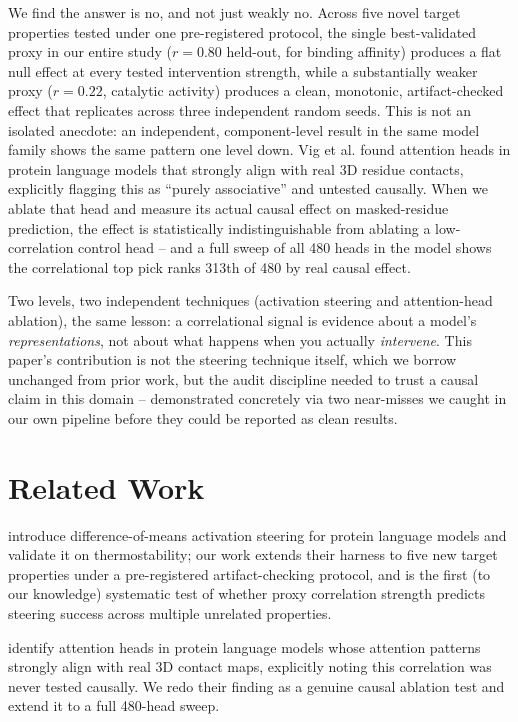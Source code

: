 \documentclass{article}
\begin{document}
We find the answer is no, and not just weakly no. Across five novel
target properties tested under one pre-registered protocol, the single
best-validated proxy in our entire study ($r=0.80$ held-out, for binding
affinity) produces a flat null effect at every tested intervention
strength, while a substantially weaker proxy ($r=0.22$, catalytic
activity) produces a clean, monotonic, artifact-checked effect that
replicates across three independent random seeds. This is not an isolated
anecdote: an independent, component-level result in the same model
family shows the same pattern one level down. Vig et al.
\citep{vig2021bertology} found attention heads in protein language models
that strongly align with real 3D residue contacts, explicitly flagging
this as ``purely associative'' and untested causally. When we ablate
that head and measure its actual causal effect on masked-residue
prediction, the effect is statistically indistinguishable from ablating
a low-correlation control head -- and a full sweep of all 480 heads in
the model shows the correlational top pick ranks 313th of 480 by real
causal effect.

Two levels, two independent techniques (activation steering and
attention-head ablation), the same lesson: a correlational signal is
evidence about a model's \emph{representations}, not about what happens
when you actually \emph{intervene}. This paper's contribution is not the
steering technique itself, which we borrow unchanged from prior work, but
the audit discipline needed to trust a causal claim in this domain --
demonstrated concretely via two near-misses we caught in our own
pipeline before they could be reported as clean results.

\section{Related Work}

\citet{huang2025steering} introduce difference-of-means activation
steering for protein language models and validate it on thermostability;
our work extends their harness to five new target properties under a
pre-registered artifact-checking protocol, and is the first (to our
knowledge) systematic test of whether proxy correlation strength predicts
steering success across multiple unrelated properties.

\citet{vig2021bertology} identify attention heads in protein language
models whose attention patterns strongly align with real 3D contact
maps, explicitly noting this correlation was never tested causally. We
redo their finding as a genuine causal ablation test and extend it to a
full 480-head sweep.
\end{document}
